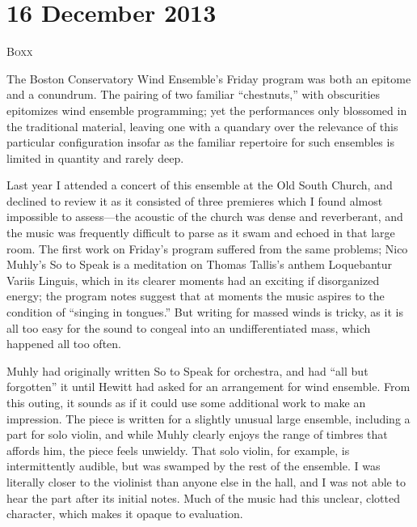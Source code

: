 \chapter{16 December 2013}

\textsc{Boxx}

The Boston Conservatory Wind Ensemble’s Friday program was both an epitome and a conundrum. The pairing of two familiar “chestnuts,” with obscurities epitomizes wind ensemble programming; yet the performances only blossomed in the traditional material, leaving one with a quandary over the relevance of this particular configuration insofar as the familiar repertoire for such ensembles is limited in quantity and rarely deep.

Last year I attended a concert of this ensemble at the Old South Church, and declined to review it as it consisted of three premieres which I found almost impossible to assess—the acoustic of the church was dense and reverberant, and the music was frequently difficult to parse as it swam and echoed in that large room. The first work on Friday’s program suffered from the same problems; Nico Muhly’s So to Speak is a meditation on Thomas Tallis’s anthem Loquebantur Variis Linguis, which in its clearer moments had an exciting if disorganized energy; the program notes suggest that at moments the music aspires to the condition of “singing in tongues.” But writing for massed winds is tricky, as it is all too easy for the sound to congeal into an undifferentiated mass, which happened all too often.

Muhly had originally written So to Speak for orchestra, and had “all but forgotten” it until Hewitt had asked for an arrangement for wind ensemble. From this outing, it sounds as if it could use some additional work to make an impression. The piece is written for a slightly unusual large ensemble, including a part for solo violin, and while Muhly clearly enjoys the range of timbres that affords him, the piece feels unwieldy. That solo violin, for example, is intermittently audible, but was swamped by the rest of the ensemble. I was literally closer to the violinist than anyone else in the hall, and I was not able to hear the part after its initial notes. Much of the music had this unclear, clotted character, which makes it opaque to evaluation.


